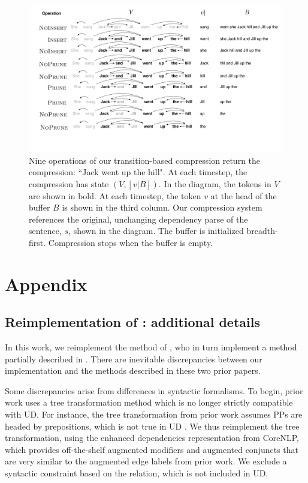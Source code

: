 
\begin{figure}[htb!]
\centering
\includegraphics[width=.75\textwidth]{worked.pdf}
\caption{Nine operations of our transition-based compression return the compression: ``Jack went up the hill". At each timestep, the compression has state $(V, [v|B])$. In the diagram, the tokens in $V$ are shown in bold. At each timestep, the token $v$ at the head of the buffer $B$ is shown in the third column. Our compression system references the original, unchanging dependency parse of the sentence, $s$, shown in the diagram. The buffer is initialized breadth-first. Compression stops when the buffer is empty.}
\label{f:example}
\end{figure}

\section{Appendix}


\subsection{Reimplementation of \citet{filippova2013overcoming}: additional details}

In this work, we reimplement the method of \citet{filippova2013overcoming}, who in turn implement a method partially described in \citet{filippova2008dependency}.  There are inevitable discrepancies between our implementation and the methods described in these two prior papers.  

Some discrepancies arise from differences in syntactic formalisms. To begin, prior work uses a tree transformation method which is no longer strictly compatible with UD. For instance, the tree transformation from prior work assumes PPs are headed by prepositions, which is not true in UD \cite{Schuster2016EnhancedEU}. We thus reimplement the tree transformation, using the enhanced dependencies representation from CoreNLP, which provides off-the-shelf augmented modifiers and augmented conjuncts that are very similar to the augmented edge labels from prior work. We exclude a syntactic constraint based on the  relation, which is not included in UD.

